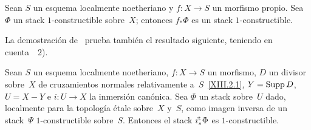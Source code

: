
\begin{corollaire}
\label{XIII.6.2}
Sean
$S$ un esquema localmente noetheriano y $f\colon X\to S$ un morfismo
propio. Sea $\Phi$ un stack $1$-constructible sobre~$X$; entonces
$f_*\Phi$ es un stack \hbox{$1$-constructible}.
\end{corollaire}

La demostración de~ prueba también el resultado siguiente,
teniendo en cuenta~~2).

\begin{corollaire}
\label{XIII.6.3}
Sean $S$ un esquema localmente noetheriano, $f\colon X\to S$ un
morfismo, $D$ un divisor sobre~$X$ de cruzamientos normales
relativamente a~$S$~\eqref{XIII.2.1}, $Y=\operatorname{Supp} D$, $U=X-Y$ e
$i\colon U\to X$ la inmersión canónica. Sea $\Phi$ un stack sobre~$U$
dado, localmente para la topología étale sobre~$X$ y~$S$, como imagen
inversa de un stack~$\Psi$ $1$-constructible sobre~$S$. Entonces el
stack $i_*^{\mathrm{t}}\Phi$ es $1$-constructible.
\end{corollaire}
